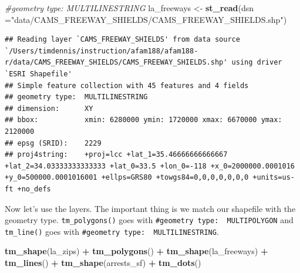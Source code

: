 \documentclass[]{book}
\newenvironment{Shaded}{\begin{snugshade}}{\end{snugshade}}
\newcommand{\CommentTok}[1]{\textcolor[rgb]{0.56,0.35,0.01}{\textit{#1}}}
\newcommand{\DataTypeTok}[1]{\textcolor[rgb]{0.13,0.29,0.53}{#1}}
\newcommand{\KeywordTok}[1]{\textcolor[rgb]{0.13,0.29,0.53}{\textbf{#1}}}
\newcommand{\NormalTok}[1]{#1}
\newcommand{\OperatorTok}[1]{\textcolor[rgb]{0.81,0.36,0.00}{\textbf{#1}}}
\newcommand{\StringTok}[1]{\textcolor[rgb]{0.31,0.60,0.02}{#1}}
\begin{document}
\begin{Shaded}
\begin{Highlighting}[]
\CommentTok{#geometry type:  MULTILINESTRING}
\NormalTok{la_freeways <-}\StringTok{ }\KeywordTok{st_read}\NormalTok{(}\DataTypeTok{dsn =}\StringTok{"data/CAMS_FREEWAY_SHIELDS/CAMS_FREEWAY_SHIELDS.shp"}\NormalTok{)}
\end{Highlighting}
\end{Shaded}

\begin{verbatim}
## Reading layer `CAMS_FREEWAY_SHIELDS' from data source `/Users/timdennis/instruction/afam188/afam188-r/data/CAMS_FREEWAY_SHIELDS/CAMS_FREEWAY_SHIELDS.shp' using driver `ESRI Shapefile'
## Simple feature collection with 45 features and 4 fields
## geometry type:  MULTILINESTRING
## dimension:      XY
## bbox:           xmin: 6280000 ymin: 1720000 xmax: 6670000 ymax: 2120000
## epsg (SRID):    2229
## proj4string:    +proj=lcc +lat_1=35.46666666666667 +lat_2=34.03333333333333 +lat_0=33.5 +lon_0=-118 +x_0=2000000.0001016 +y_0=500000.0001016001 +ellps=GRS80 +towgs84=0,0,0,0,0,0,0 +units=us-ft +no_defs
\end{verbatim}

Now let's use the layers. The important thing is we match our shapefile with the geometry type. \texttt{tm\_polygons()} goes with \texttt{\#geometry\ type:\ \ MULTIPOLYGON} and \texttt{tm\_line()} goes with \texttt{\#geometry\ type:\ \ MULTILINESTRING}.

\begin{Shaded}
\begin{Highlighting}[]
\KeywordTok{tm_shape}\NormalTok{(la_zips) }\OperatorTok{+}
\StringTok{  }\KeywordTok{tm_polygons}\NormalTok{() }\OperatorTok{+}
\KeywordTok{tm_shape}\NormalTok{(la_freeways) }\OperatorTok{+}
\StringTok{  }\KeywordTok{tm_lines}\NormalTok{() }\OperatorTok{+}
\KeywordTok{tm_shape}\NormalTok{(arrests_sf) }\OperatorTok{+}
\StringTok{  }\KeywordTok{tm_dots}\NormalTok{() }
\end{Highlighting}
\end{Shaded}
\end{document}
